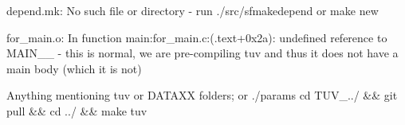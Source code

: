 
\begin{DoxyEnumerate}
\item {\ttfamily depend.\+mk\+: No such file or directory} -\/ run {\ttfamily ./src/sfmakedepend} or {\ttfamily make new}
\item {\ttfamily for\+\_\+main.\+o\+: In function main\+:for\+\_\+main.\+c\+:(.text+0x2a)\+: undefined reference to M\+A\+I\+N\+\_\+\+\_\+} -\/ this is normal, we are pre-\/compiling tuv and thus it does not have a main body (which it is not)
\item Anything mentioning tuv or D\+A\+T\+A\+XX folders; or ./params {\ttfamily cd T\+U\+V\+\_../ \&\& git pull \&\& cd ../ \&\& make tuv} 
\end{DoxyEnumerate}